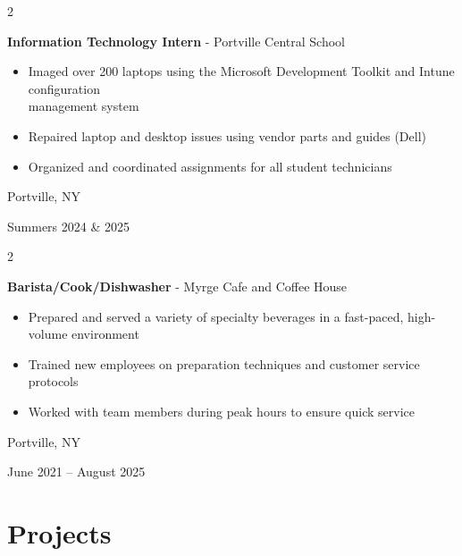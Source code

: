 \documentclass[10pt, letterpaper]{article}
\newenvironment{highlights}{
    \begin{itemize}[
        topsep=0.10 cm,
        parsep=0.10 cm,
        partopsep=0pt,
        itemsep=0pt,
        leftmargin=0.4 cm + 10pt
    ]
}{
    \end{itemize}
} %
\newenvironment{twocolentry}[2][]{
    \onecolentry
    \def\secondColumn{#2}
    \setcolumnwidth{\fill, 4.5 cm}
    \begin{paracol}{2}
}{
    \switchcolumn \raggedleft \secondColumn
    \end{paracol}
    \endonecolentry
} %
\begin{document}
        \vspace{0.05 cm}

       \begin{twocolentry}{
            Portville, NY

        Summers 2024 \& 2025
        }
            \textbf{Information Technology Intern} - Portville Central School
            \begin{highlights}
                
                \item Imaged over 200 laptops using the Microsoft Development Toolkit and Intune configuration \\
                management system
                \item Repaired laptop and desktop issues using vendor parts and guides (Dell)
                \item Organized and coordinated assignments for all student technicians
    
            \end{highlights}
        \end{twocolentry}
        


        \begin{twocolentry}{
            Portville, NY

        June 2021 – August 2025
        }
            \textbf{Barista/Cook/Dishwasher} - Myrge Cafe and Coffee House
            \begin{highlights}
                \item Prepared and served a variety of specialty beverages in a fast-paced, high-volume environment
                \item Trained new employees on preparation techniques and customer service protocols
                \item Worked with team members during peak hours to ensure quick service
            \end{highlights}
        \end{twocolentry}

   \section{\large\bfseries Projects} 
      
  \begingroup
        \small
\end{document}
